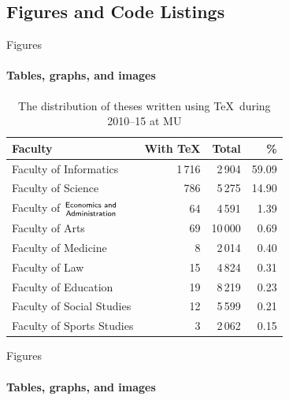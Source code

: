 \documentclass{beamer}
\begin{document}
\begin{darkframes}
    \subsection{Figures and Code Listings}
    \begin{frame}[label=figs1]{Figures}
      \framesubtitle{Tables, graphs, and images}
      \begin{table}[!b]
        {\carlitoTLF %
        \begin{tabularx}{\textwidth}{Xrrr}
          \textbf{Faculty} & \textbf{With \TeX} & \textbf{Total} &
          \textbf{\%} \\
          \toprule
          Faculty of Informatics       & 1\,716  & 2\,904  &
          59.09 \\%
          Faculty of Science           & 786     & 5\,275  &
          14.90 \\%
          Faculty of $\genfrac{}{}{0pt}{}{\textsf{Economics and}}{%
          \textsf{Administration}}$    & 64      & 4\,591  &
          1.39  \\%
          Faculty of Arts              & 69      & 10\,000 &
          0.69  \\%
          Faculty of Medicine          & 8       & 2\,014  &
          0.40  \\%
          Faculty of Law               & 15      & 4\,824  &
          0.31  \\%
          Faculty of Education         & 19      & 8\,219  &
          0.23  \\%
          Faculty of Social Studies    & 12      & 5\,599  &
          0.21  \\%
          Faculty of Sports Studies    & 3       & 2\,062  &
          0.15  \\%
          \bottomrule
        \end{tabularx}}
        \caption{The distribution of theses written using \TeX\ during 2010--15 at MU}
      \end{table}
    \end{frame}
    \begin{frame}[label=figs2]{Figures}
      \framesubtitle{Tables, graphs, and images}
      \begin{figure}[b]
        \centering
        \scalebox{0.65}{\begin{tikzpicture}[

\end{tikzpicture}}
\end{figure}
\end{frame}
\end{darkframes}
\end{document}
